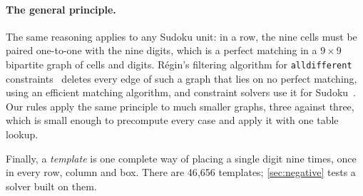 \paragraph{The general principle.} The same reasoning applies to any Sudoku unit: in a row, the nine cells must be
paired one-to-one with the nine digits, which is a perfect matching in a $9\times 9$ bipartite graph of cells and digits.
R\'egin's filtering algorithm for \texttt{alldifferent} constraints~\cite{regin1994filtering} deletes every edge of such
a graph that lies on no perfect matching, using an efficient matching algorithm, and constraint solvers use it for
Sudoku~\cite{simonis2005sudoku}. Our rules apply the same principle to much smaller graphs, three against three, which
is small enough to precompute every case and apply it with one table lookup.

Finally, a \emph{template} is one complete way of placing a single digit nine times, once in every row, column and
box. There are 46{,}656 templates; \cref{sec:negative} tests a solver built on them.


